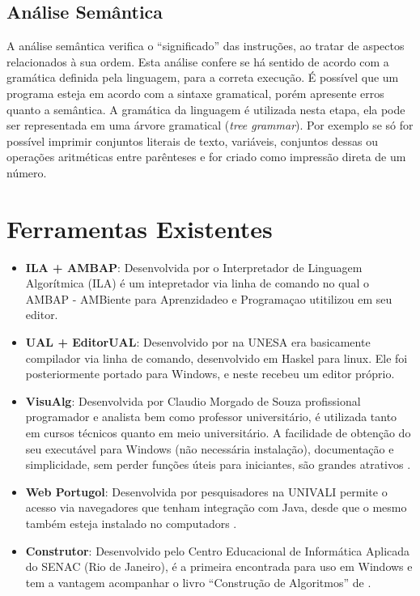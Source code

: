 \subsection{Análise Semântica}

A análise semântica verifica o ``significado'' das instruções, ao tratar de aspectos relacionados à sua ordem. Esta análise confere se há sentido de acordo com a gramática definida pela linguagem, para a correta execução. É possível que um programa esteja em acordo com a sintaxe gramatical, porém apresente erros quanto a semântica. A gramática da linguagem é utilizada nesta etapa, ela pode ser representada em uma árvore gramatical (\textit{tree grammar}). Por exemplo se só for possível imprimir conjuntos literais de texto, variáveis, conjuntos dessas ou operações aritméticas entre parênteses e for criado como impressão direta de um número.

\section{Ferramentas Existentes}

\begin{itemize}

\item \textbf{ILA + AMBAP}: Desenvolvida por  o Interpretador de Linguagem Algorítmica (ILA) é um intepretador via linha de comando no qual o AMBAP - AMBiente para Aprenzidadeo e Programaçao utitilizou em seu editor.

\item \textbf{UAL + EditorUAL}: Desenvolvido por  na UNESA era basicamente compilador via linha de comando, desenvolvido em Haskel para linux. Ele foi posteriormente portado para Windows, e neste recebeu um editor próprio.

\item \textbf{VisuAlg}: Desenvolvida por Claudio Morgado de Souza profissional programador e analista bem como professor universitário, é utilizada tanto em cursos técnicos quanto em meio universitário. A facilidade de obtenção do seu executável para Windows (não necessária instalação), documentação e simplicidade, sem perder funções úteis para iniciantes, são grandes atrativos \cite{souza2013etal}.

\item \textbf{Web Portugol}: Desenvolvida por pesquisadores na UNIVALI permite o acesso via navegadores que tenham integração com Java, desde que o mesmo também esteja instalado no computadors \cite{souza2013etal}.

\item \textbf{Construtor}: Desenvolvido pelo Centro Educacional de Informática Aplicada do SENAC (Rio de Janeiro), é a primeira encontrada para uso em Windows e tem a vantagem acompanhar o livro ``Construção de Algoritmos'' de .

\end{itemize}

